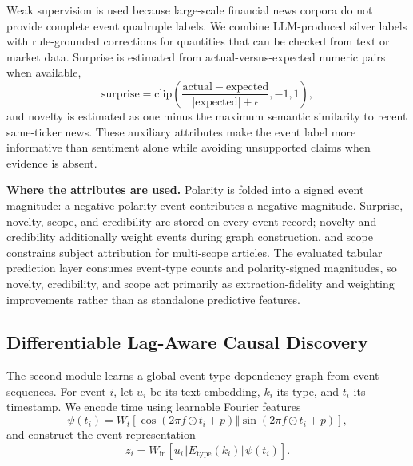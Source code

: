 \documentclass[sigconf,review]{acmart}
\begin{document}
Weak supervision is used because large-scale financial news corpora do not provide complete event quadruple labels. We combine LLM-produced silver labels with rule-grounded corrections for quantities that can be checked from text or market data. Surprise is estimated from actual-versus-expected numeric pairs when available,
\begin{equation}
\mathrm{surprise}=\mathrm{clip}\left(\frac{\mathrm{actual}-\mathrm{expected}}{|\mathrm{expected}|+\epsilon},-1,1\right),
\end{equation}
and novelty is estimated as one minus the maximum semantic similarity to recent same-ticker news. These auxiliary attributes make the event label more informative than sentiment alone while avoiding unsupported claims when evidence is absent.

\textbf{Where the attributes are used.} Polarity is folded into a signed event magnitude: a negative-polarity event contributes a negative magnitude. Surprise, novelty, scope, and credibility are stored on every event record; novelty and credibility additionally weight events during graph construction, and scope constrains subject attribution for multi-scope articles. The evaluated tabular prediction layer consumes event-type counts and polarity-signed magnitudes, so novelty, credibility, and scope act primarily as extraction-fidelity and weighting improvements rather than as standalone predictive features.

\subsection{Differentiable Lag-Aware Causal Discovery}

The second module learns a global event-type dependency graph from event sequences. For event $i$, let $u_i$ be its text embedding, $k_i$ its type, and $t_i$ its timestamp. We encode time using learnable Fourier features
\begin{equation}
\psi(t_i)=W_t[\cos(2\pi f\odot t_i+p)\Vert \sin(2\pi f\odot t_i+p)],
\end{equation}
and construct the event representation
\begin{equation}
z_i=W_{\mathrm{in}}[u_i\Vert E_{\mathrm{type}}(k_i)\Vert \psi(t_i)].
\end{equation}
\end{document}
